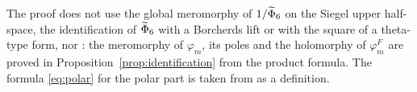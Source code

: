 \begin{remark}\label{rem:notused}
The proof does not use the global meromorphy of $1/\widetilde\Phi_6$ on the Siegel upper half-space, the identification of $\widetilde\Phi_6$ with a Borcherds lift or with the square of a theta-type form, nor \cite[Theorem~5.2]{BSS25}: the meromorphy of $\varphi_m$, its poles and the holomorphy of $\varphi^F_m$ are proved in Proposition~\ref{prop:identification} from the product formula. The formula \eqref{eq:polar} for the polar part is taken from \cite[(5.45)]{BSS25} as a definition.
\end{remark}
